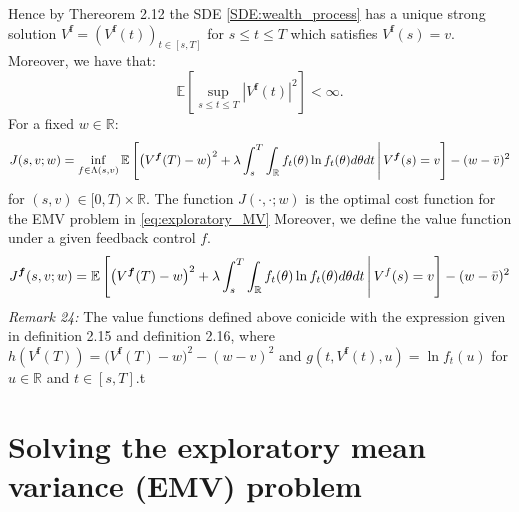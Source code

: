 \documentclass[oneside, a4paper, onecolumn, 11pt]{article}
\begin{document}
Hence by Thereorem 2.12 the SDE \eqref{SDE:wealth_process} has a unique strong solution $V^{\boldsymbol{f}}=(V^{\boldsymbol{f}}(t))_{t\in [s,T]}$ for $s\leq t \leq T$ which satisfies $V^{\boldsymbol{f}}(s) =  v $. Moreover, we have that: 
\begin{equation}
\mathbb{E}\left[ \sup_{s \leq t \leq T} \left|V^{\boldsymbol{f}}(t)\right|^2 \right] < \infty \label{ineq:bounded_square_exp}.
\end{equation}
For a fixed $w \in \mathbb{R}$: 
\begin{equation}
J(s,v;w) = \inf_{f \in \Lambda(s,v)} \mathbb{E}\left[\big(V^{\boldsymbol{f}}(T) - w\big)^2 + \lambda \int_s^T \int_{\mathbb{R}} f_t(\theta) \ln f_t(\theta) d\theta dt \,\middle|\, V^{\boldsymbol{f}}(s) = v\right] - (w -\Bar{v})^2 \label{eq:optimal_value_function}
\end{equation}
for $(s,v) \in [0,T)\times \mathbb{R}$. The function $J(\cdot, \cdot; w)$  is the optimal cost function for the EMV problem in \eqref{eq:exploratory_MV}
Moreover, we define the value function under a given feedback control $f$. 
\begin{equation}  
J^{\boldsymbol{f}}(s,v;w) = \mathbb{E}\left[\big(V^{\boldsymbol{f}}(T) - w\big)^2 +  \lambda \int_s^T \int_{\mathbb{R}} f_t(\theta) \ln f_t(\theta) d\theta dt \,\middle|\, V^f(s) = v\right] - (w -\Bar{v})^2 \label{value_function_under_policy}
\end{equation}
\textit{Remark 24:} The value functions defined above conicide with the expression given in definition 2.15 and definition 2.16, where $h(V^{\boldsymbol{f}}(T))= \big(V^{\boldsymbol{f}}(T) - w\big)^2 - (w-v)^2$ and $g(t,V^{\boldsymbol{f}}(t),u) = \ln{f_t(u)}$ for $u\in \mathbb{R}$ and $t\in [s,T]$.t
\section{Solving the exploratory mean variance (EMV) problem}
\end{document}
